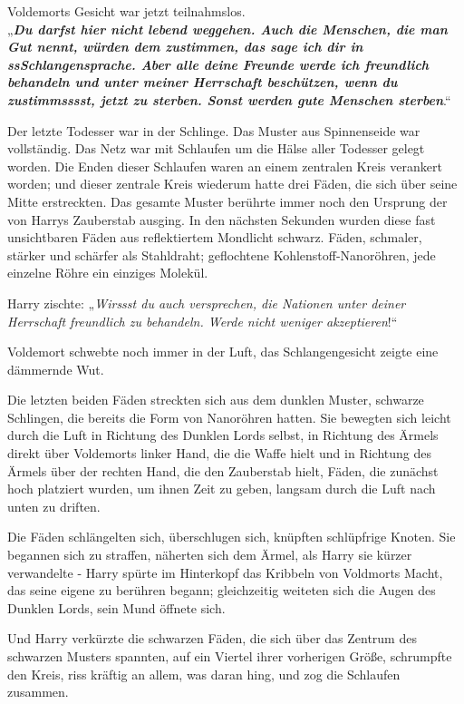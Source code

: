 {Voldemorts Gesicht war jetzt teilnahmslos.\\ „\textbf{\emph{Du darfst hier nicht lebend weggehen. Auch die Menschen, die man Gut nennt, würden dem zustimmen, das sage ich dir in ssSchlangensprache. Aber alle deine Freunde werde ich freundlich behandeln und unter meiner Herrschaft beschützen, wenn du zustimmsssst, jetzt zu sterben. Sonst werden gute Menschen sterben}}.“

Der letzte Todesser war in der Schlinge. Das Muster aus Spinnenseide war vollständig. Das Netz war mit Schlaufen um die Hälse aller Todesser gelegt worden. Die Enden dieser Schlaufen waren an einem zentralen Kreis verankert worden; und dieser zentrale Kreis wiederum hatte drei Fäden, die sich über seine Mitte erstreckten. Das gesamte Muster berührte immer noch den Ursprung der von Harrys Zauberstab ausging. In den nächsten Sekunden wurden diese fast unsichtbaren Fäden aus reflektiertem Mondlicht schwarz. Fäden, schmaler, stärker und schärfer als Stahldraht; geflochtene Kohlenstoff-Nanoröhren, jede einzelne Röhre ein einziges Molekül.

Harry zischte: „\emph{Wirssst du auch versprechen, die Nationen unter deiner Herrschaft freundlich zu behandeln. Werde nicht weniger akzeptieren}!“

Voldemort schwebte noch immer in der Luft, das Schlangengesicht zeigte eine dämmernde Wut.

Die letzten beiden Fäden streckten sich aus dem dunklen Muster, schwarze Schlingen, die bereits die Form von Nanoröhren hatten. Sie bewegten sich leicht durch die Luft in Richtung des Dunklen Lords selbst, in Richtung des Ärmels direkt über Voldemorts linker Hand, die die Waffe hielt und in Richtung des Ärmels über der rechten Hand, die den Zauberstab hielt, Fäden, die zunächst hoch platziert wurden, um ihnen Zeit zu geben, langsam durch die Luft nach unten zu driften.

Die Fäden schlängelten sich, überschlugen sich, knüpften schlüpfrige Knoten. Sie begannen sich zu straffen, näherten sich dem Ärmel, als Harry sie kürzer verwandelte - Harry spürte im Hinterkopf das Kribbeln von Voldmorts Macht, das seine eigene zu berühren begann; gleichzeitig weiteten sich die Augen des Dunklen Lords, sein Mund öffnete sich.

Und Harry verkürzte die schwarzen Fäden, die sich über das Zentrum des schwarzen Musters spannten, auf ein Viertel ihrer vorherigen Größe, schrumpfte den Kreis, riss kräftig an allem, was daran hing, und zog die Schlaufen zusammen.

}
